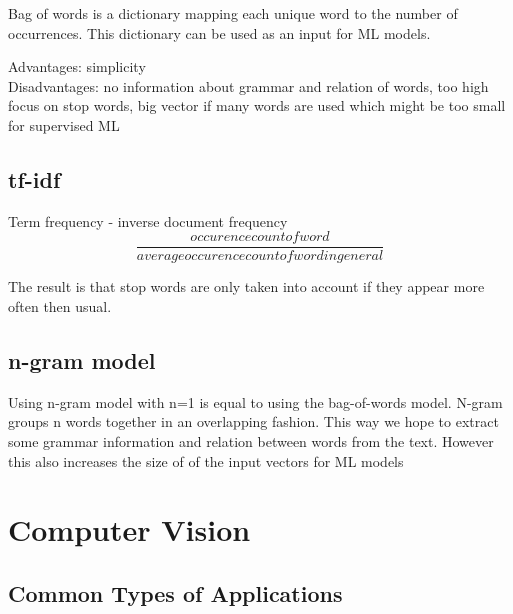 Bag of words is a dictionary mapping each unique word to the number of occurrences. This dictionary can be used as an input for ML models.

Advantages: simplicity\\
Disadvantages: no information about grammar and relation of words, too high focus on stop words, big vector if many words are used which might be too small for supervised ML

\subsection{tf-idf}
Term frequency - inverse document frequency\\
$$
    \frac{occurence count of word}{average occurence count of word in general}
$$

The result is that stop words are only taken into account if they appear more often then usual.

\subsection{n-gram model}

Using n-gram model with n=1 is equal to using the bag-of-words model. N-gram groups n words together in an overlapping fashion. This way we hope to extract some grammar information and relation between words from the text. However this also increases the size of of the input vectors for ML models




\section{Computer Vision}

\subsection{Common Types of Applications}

